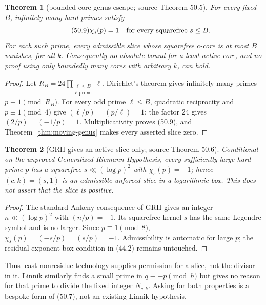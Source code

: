 \documentclass[10pt,reqno]{amsart}
\newtheorem{theorem}{Theorem}[section]
\theoremstyle{definition}
\newcommand{\1}{\mathbf 1}
\begin{document}
\begin{theorem}[bounded-core genus escape; source Theorem 50.5]
\label{thm:bounded-core}
For every fixed $B$, infinitely many hard primes satisfy
\begin{equation}\tag{50.9}
 \chi_s(p)=1\quad\hbox{for every squarefree }s\leq B.
\end{equation}
For each such prime, every admissible slice whose squarefree $c$-core is at
most $B$ vanishes, for all $k$.  Consequently no absolute bound for a least
active core, and no proof using only boundedly many cores with arbitrary
$k$, can hold.
\end{theorem}
\begin{proof}
Let
$R_B=24\prod_{\substack{\ell\leq B\\ \ell\text{ prime}}}\ell$.
Dirichlet's theorem gives infinitely many primes $p\equiv1\pmod {R_B}$.
For every odd prime $\ell\leq B$, quadratic reciprocity and
$p\equiv1\pmod4$ give $(\ell/p)=(p/\ell)=1$; the factor $24$ gives
$(2/p)=(-1/p)=1$.  Multiplicativity proves (50.9), and
Theorem~\ref{thm:moving-genus} makes every asserted slice zero.
\end{proof}

\begin{theorem}[GRH gives an active slice only; source Theorem 50.6]
\label{thm:GRH-active}
Conditional on the unproved Generalized Riemann Hypothesis, every
sufficiently large hard prime $p$ has a squarefree
$s\ll(\log p)^2$ with $\chi_s(p)=-1$; hence $(c,k)=(s,1)$ is an admissible
unforced slice in a logarithmic box.  This does \emph{not} assert that the
slice is positive.
\end{theorem}
\begin{proof}
The standard Ankeny consequence of GRH gives an integer
$n\ll(\log p)^2$ with $(n/p)=-1$.  Its squarefree kernel $s$ has the same
Legendre symbol and is no larger.  Since $p\equiv1\pmod8$,
$\chi_s(p)=(-s/p)=(s/p)=-1$.  Admissibility is automatic for large $p$;
the residual exponent-box condition in (44.2) remains untouched.
\end{proof}
Thus least-nonresidue technology supplies permission for a slice, not the
divisor in it.  Linnik similarly finds a small prime in
$q\equiv-p\pmod h$ but gives no reason for that prime to divide the fixed
integer $N_{c,k}$.  Asking for both properties is a bespoke form of (50.7),
not an existing Linnik hypothesis.
\end{document}
